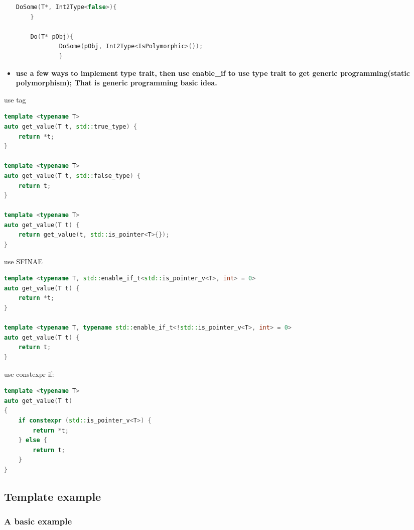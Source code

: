 \documentclass[a4paper,12pt,twoside]{book}
\begin{document}
\begin{itemize}
\begin{lstlisting}[frame=single, language=c++]
DoSome(T*, Int2Type<false>){
	}
	
	Do(T* pObj){
			DoSome(pObj, Int2Type<IsPolymorphic>());
			}

\end{lstlisting}	

\item \textbf{use a few ways to implement type trait, then use enable\_if to use type trait to get generic programming(static polymorphism); That is generic programming basic idea.}
\end{itemize}


use tag
	\begin{lstlisting}[frame=single, language=c++]
template <typename T>
auto get_value(T t, std::true_type) {
    return *t;
}

template <typename T>
auto get_value(T t, std::false_type) {
    return t;
}

template <typename T>
auto get_value(T t) {
    return get_value(t, std::is_pointer<T>{}); 
}
\end{lstlisting}
use SFINAE 

	\begin{lstlisting}[frame=single, language=c++]
template <typename T, std::enable_if_t<std::is_pointer_v<T>, int> = 0>
auto get_value(T t) {
    return *t;
}

template <typename T, typename std::enable_if_t<!std::is_pointer_v<T>, int> = 0>
auto get_value(T t) {
    return t;
}
\end{lstlisting}
use constexpr if: 

	\begin{lstlisting}[frame=single, language=c++]
template <typename T>
auto get_value(T t)
{
    if constexpr (std::is_pointer_v<T>) {
        return *t;
    } else {
        return t;
    }
}
\end{lstlisting}


\subsection{Template example}

\subsubsection{A basic example}
\end{document}
